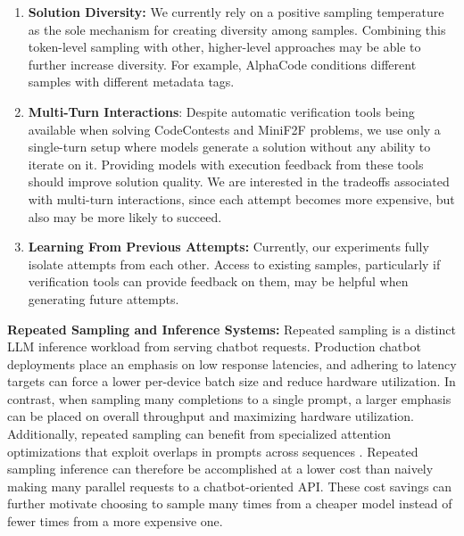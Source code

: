\documentclass[11pt]{article}
\begin{document}
\begin{enumerate}
    \item \textbf{Solution Diversity:} We currently rely on a positive sampling temperature as the sole mechanism for creating diversity among samples. Combining this token-level sampling with other, higher-level approaches may be able to further increase diversity. For example, AlphaCode conditions different samples with different metadata tags.

    \item \textbf{Multi-Turn Interactions}: Despite automatic verification tools being available when solving CodeContests and MiniF2F problems, we use only a single-turn setup where models generate a solution without any ability to iterate on it. Providing models with execution feedback from these tools should improve solution quality. We are interested in the tradeoffs associated with multi-turn interactions, since each attempt becomes more expensive, but also may be more likely to succeed.
    \item \textbf{Learning From Previous Attempts:} Currently, our experiments fully isolate attempts from each other. Access to existing samples, particularly if verification tools can provide feedback on them, may be helpful when generating future attempts.
\end{enumerate}

\; 

\noindent \textbf{Repeated Sampling and Inference Systems:} Repeated sampling is a distinct LLM inference workload from serving chatbot requests. Production chatbot deployments place an emphasis on low response latencies, and adhering to latency targets can force a lower per-device batch size and reduce hardware utilization. In contrast, when sampling many completions to a single prompt, a larger emphasis can be placed on overall throughput and maximizing hardware utilization. Additionally, repeated sampling can benefit from specialized attention optimizations that exploit overlaps in prompts across sequences \cite{juravsky2024hydragen, athiwaratkun2024bifurcatedattentionacceleratingmassively, zheng2024sglangefficientexecutionstructured}. Repeated sampling inference can therefore be accomplished at a lower cost than naively making many parallel requests to a chatbot-oriented API. These cost savings can further motivate choosing to sample many times from a cheaper model instead of fewer times from a more expensive one. 

\;
\end{document}
